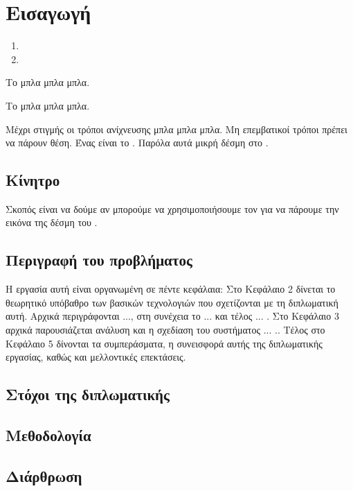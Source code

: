 \chapter{Εισαγωγή}

\begin{enumerate}
\item {}
\item {}
\end{enumerate}

Το  μπλα μπλα μπλα.

Το  μπλα μπλα μπλα.

Μέχρι στιγμής οι τρόποι ανίχνευσης μπλα μπλα μπλα.
Μη επεμβατικοί τρόποι πρέπει να πάρουν θέση. Ένας είναι το . Παρόλα αυτά μικρή δέσμη στο . 

\section{Κίνητρο}
Σκοπός είναι να δούμε αν μπορούμε να χρησιμοποιήσουμε τον  για να πάρουμε την εικόνα της δέσμη του .

\section{Περιγραφή του προβλήματος}
Η εργασία αυτή είναι οργανωμένη σε πέντε κεφάλαια: Στο Κεφάλαιο 2
δίνεται το θεωρητικό υπόβαθρο των βασικών τεχνολογιών που
σχετίζονται με τη διπλωματική αυτή. Αρχικά περιγράφονται ..., στη συνέχεια το ... και τέλος ... . 
Στο Κεφάλαιο 3 αρχικά παρουσιάζεται ανάλυση και η σχεδίαση του συστήματος ... .. Τέλος στο Κεφάλαιο 5 δίνονται τα συμπεράσματα, η συνεισφορά αυτής της
διπλωματικής εργασίας, καθώς και μελλοντικές επεκτάσεις.

\section{Στόχοι της διπλωματικής}

\section{Μεθοδολογία}

\section{Διάρθρωση}